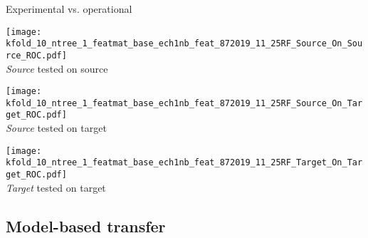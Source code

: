 \begin{frame}{Experimental vs. operational}
\renewcommand{\ratio}{0.32}
\begin{minipage}[t]{\linewidth}
    \centering
    \begin{minipage}[t]{\ratio\linewidth}
        \centering
        \texttt{[image: kfold\_10\_ntree\_1\_featmat\_base\_ech1nb\_feat\_872019\_11\_25RF\_Source\_On\_Source\_ROC.pdf]}\\
        {\small \emph{Source} tested on source}
    \end{minipage}
    \begin{minipage}[t]{\ratio\linewidth}
        \centering
        \texttt{[image: kfold\_10\_ntree\_1\_featmat\_base\_ech1nb\_feat\_872019\_11\_25RF\_Source\_On\_Target\_ROC.pdf]}\\
        {\small \emph{Source} tested on target}
    \end{minipage}
    \begin{minipage}[t]{\ratio\linewidth}
        \centering
        \texttt{[image: kfold\_10\_ntree\_1\_featmat\_base\_ech1nb\_feat\_872019\_11\_25RF\_Target\_On\_Target\_ROC.pdf]}\\
        {\small \emph{Target} tested on target}
    \end{minipage}
\end{minipage}

\end{frame}

\subsection{Model-based transfer}

